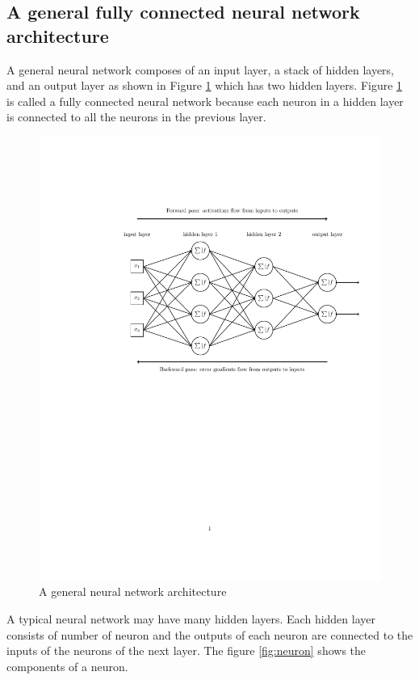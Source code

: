 \documentclass{article}
\begin{document}
\subsection{A general fully connected neural network architecture } \label{FCNN}
A general neural network composes of an input layer, a stack of hidden layers, and an output layer as shown in Figure \ref{fig:NN} which has two hidden layers. Figure \ref{fig:NN} is called a fully connected neural network because each neuron in a hidden layer is connected to all the neurons in the previous layer.
\begin{figure}[h]
	\includegraphics[width=.75\textwidth]{NN.pdf}
	\caption{A general neural network architecture}
	\label{fig:NN}
\end{figure}
A typical neural network may have many hidden layers. Each hidden layer consists of number of neuron and the outputs of each neuron are connected to the inputs of the neurons of the next layer.
The figure \ref{fig:neuron} shows the components of a neuron. 
\end{document}
